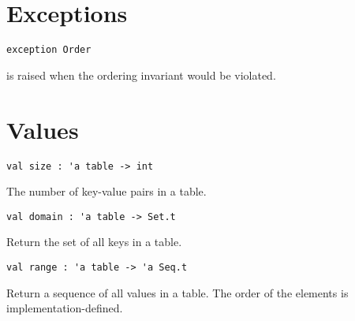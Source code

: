 \section{Exceptions}
\label{sec:ordtable-interface::exceptions}

\begin{cluster}
\label{grp:grm:ordtable-interface::exception}

\begin{gram}
\label{grm:ordtable-interface::exception}
\begin{verbatim}
exception Order
\end{verbatim}
 is raised when the ordering invariant would be violated.

\end{gram}
\end{cluster}


\section{Values}
\label{sec:ordtable-interface::values}

\begin{cluster}
\label{grp:grm:ordtable-interface::size}

\begin{gram}[size]
\label{grm:ordtable-interface::size}
\begin{verbatim}
val size : 'a table -> int
\end{verbatim}
The number of key-value pairs in a table.

\end{gram}
\end{cluster}

\begin{cluster}
\label{grp:grm:ordtable-interface::domain}

\begin{gram}[domain]
\label{grm:ordtable-interface::domain}
\begin{verbatim}
val domain : 'a table -> Set.t
\end{verbatim}
Return the set of all keys in a table.

\end{gram}
\end{cluster}

\begin{cluster}
\label{grp:grm:ordtable-interface::range}

\begin{gram}[range]
\label{grm:ordtable-interface::range}
\begin{verbatim}
val range : 'a table -> 'a Seq.t
\end{verbatim}
Return a sequence of all values in a table. The order of the elements is
implementation-defined.

\end{gram}
\end{cluster}

